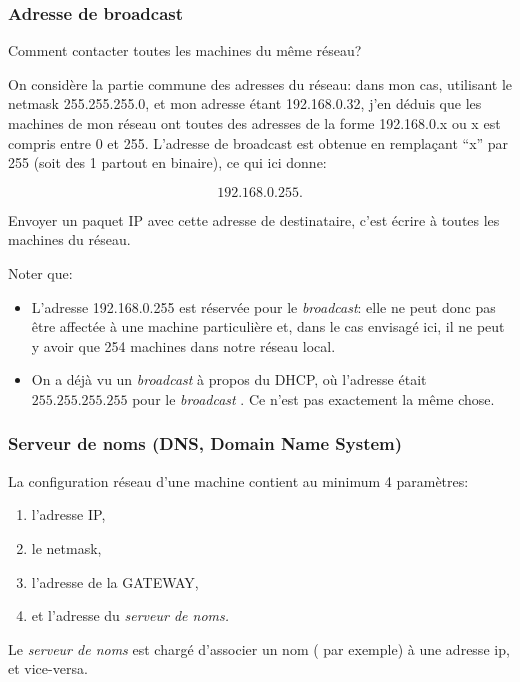  

\subsubsection{Adresse de broadcast}
Comment contacter toutes les machines du même réseau?

On considère la partie commune des adresses du réseau: dans mon cas,
utilisant le netmask 255.255.255.0, et mon adresse étant 192.168.0.32,
j'en déduis que les machines de mon réseau ont toutes des adresses de
la forme 192.168.0.x ou x est compris entre 0 et 255. L'adresse de
broadcast est obtenue en remplaçant ``x'' par 255 (soit  des 1 partout
en binaire), ce qui
ici donne:

$$192.168.0.255.$$

Envoyer un paquet IP avec cette adresse de destinataire, c'est écrire
à toutes les machines du réseau.

Noter que:
\begin{itemize}
  \item L'adresse 192.168.0.255 est réservée pour le \emph{broadcast}:
    elle ne peut donc pas être affectée à une machine particulière et,
    dans le cas envisagé ici, il ne peut y avoir que 254 machines dans
    notre réseau local.
  \item On a déjà  vu un \emph{broadcast} à propos du DHCP, où
    l'adresse était $255.255.255.255$ pour le \emph{broadcast} . Ce n'est
    pas exactement la même chose.
\end{itemize}
\subsubsection{Serveur de noms (DNS, Domain Name System)}
La configuration réseau d'une machine contient au minimum 4
paramètres:
\begin{enumerate}
\item l'adresse IP,
\item le netmask,
\item l'adresse de la GATEWAY,
\item et l'adresse du \emph{serveur de noms.}
\end{enumerate}
Le \emph{serveur de noms} est chargé d'associer un nom
( par exemple) à une adresse ip, et vice-versa.

